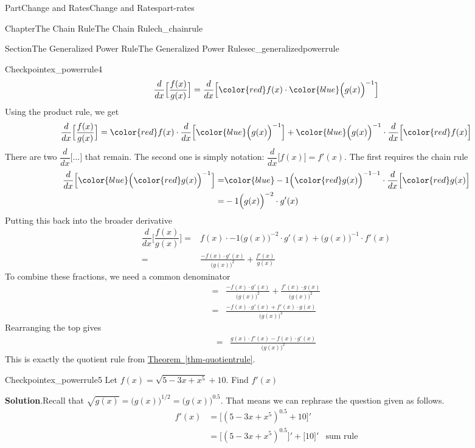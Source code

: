 \documentclass{tufte-book}
\newcommand{\blocktitlefont}{\relax}
\newcommand{\xreffont}{\relax}
\numberwithin{equation}{chapter}
\newcommand{\red}[1]{   {\color{red}   #1}   }
\newcommand{\blue}[1]{  {\color{blue}  #1}  }
\newcommand{\ddx}[1]{ \dfrac{d}{dx} \Big[ #1 \Big]  }
\newcommand{\D}[1]{ \Big[ #1 \Big]'  }
\newcommand{\amp}{&}
\begin{document}
\begin{partptx}{Part}{Change and Rates}{}{Change and Rates}{}{}{part-rates}
\begin{chapterptx}{Chapter}{The Chain Rule}{}{The Chain Rule}{}{}{ch_chainrule}
\begin{sectionptx}{Section}{The Generalized Power Rule}{}{The Generalized Power Rule}{}{}{sec_generalizedpowerrule}
\begin{inlineexercise}{Checkpoint}{}{ex_powerrule4}
\begin{equation*}
\ddx{ \dfrac{f(x)}{g(x)} }  = \ddx{ \red{f(x)}\cdot \blue{ \Big(g(x)\Big)^{-1}} } 
\end{equation*}
Using the product rule, we get%
\begin{equation*}
\ddx{ \dfrac{f(x)}{g(x)} }  = \red{f(x)}\cdot \ddx{ \blue{ \Big(g(x)\Big)^{-1}} } +  \blue{ \Big(g(x)\Big)^{-1}}\cdot \ddx{ \red{f(x)}  } 
\end{equation*}
There are two \(\ddx{\dots}\) that remain.  The second one is simply notation: \(\ddx{f(x)} = f'(x)\). The first requires the chain rule%
\begin{align*}
\ddx{ \blue{ \Big( \red{g(x)} \Big)^{-1} }  } = \amp \blue{-1 \Big(\red{g(x)} \Big)^{-1-1}} \cdot \ddx{\red{g(x)}} \\
= \amp -1 \Big(g(x)\Big)^{-2}\cdot g'(x)
\end{align*}
Putting this back into the broader derivative%
\begin{align*}
\ddx{ \dfrac{f(x)}{g(x)} }  = \amp f(x) \cdot -1 \Big(g(x))^{-2}\cdot g'(x) +   \Big(g(x)\Big)^{-1}\cdot  f'(x)   \\
=  \amp \frac{-f(x)\cdot g'(x)}{\Big(g(x)\Big)^2} + \frac{f'(x)}{g(x)} 
\end{align*}
To combine these fractions, we need a common denominator%
\begin{align*}
=  \amp \frac{-f(x)\cdot g'(x)}{\Big(g(x)\Big)^2} + \frac{f'(x)\cdot g(x)}{\Big(g(x)\Big)^2} \\
=  \amp \frac{-f(x)\cdot g'(x) + f'(x)\cdot g(x)}{\Big(g(x)\Big)^2} 
\end{align*}
Rearranging the top gives%
\begin{align*}
=  \amp \frac{ g(x)\cdot f'(x) - f(x)\cdot g'(x) }{\Big(g(x)\Big)^2} 
\end{align*}
This is exactly the quotient rule from \hyperref[thm-quotientrule]{Theorem~{\xreffont\ref{thm-quotientrule}}}.%
\end{inlineexercise}%
\begin{inlineexercise}{Checkpoint}{}{ex_powerrule5}%
Let \(f(x) = \sqrt{5-3x+x^5} + 10 \).  Find \(f'(x)\)%
\par\smallskip%
\noindent\textbf{\blocktitlefont Solution}.\hypertarget{ex_powerrule5-2}{}\quad{}Recall that \(\sqrt{g(x)} = \Big(g(x)\Big)^{1/2} =\Big(g(x)\Big)^{0.5}  \).  That means we can rephrase the question given as follows.%
\begin{align*}
f'(x) \amp = \D{ (5-3x+x^5)^{0.5} + 10 } \\
\amp =  \D{ (5-3x+x^5)^{0.5} }  + \D{ 10 } \amp \text{sum rule}\\

\end{align*}
\end{inlineexercise}
\end{sectionptx}
\end{chapterptx}
\end{partptx}
\end{document}
